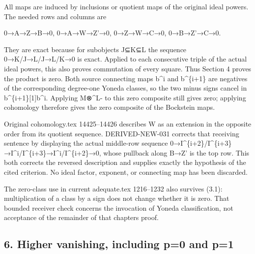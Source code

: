 All maps are induced by inclusions or quotient maps of the original ideal powers. The needed rows and columns are

0\allowbreak{}→A\allowbreak{}→Z\allowbreak{}→B\allowbreak{}→0,\allowbreak{} 0\allowbreak{}→A\allowbreak{}→W\allowbreak{}→Z'\allowbreak{}→0,\allowbreak{} 0\allowbreak{}→Z\allowbreak{}→W\allowbreak{}→C\allowbreak{}→0,\allowbreak{} 0\allowbreak{}→B\allowbreak{}→Z'\allowbreak{}→C\allowbreak{}→0.

They are exact because for subobjects J⊆K⊆L the sequence 0\allowbreak{}→K/\allowbreak{}J\allowbreak{}→L/\allowbreak{}J\allowbreak{}→L/\allowbreak{}K\allowbreak{}→0 is exact. Applied to each consecutive triple of the actual ideal powers,\allowbreak{} this also proves commutation of every square. Thus Section 4 proves the product is zero. Both source connecting maps b\^{}i and b\textasciicircum{}\{i\allowbreak{}+1\} are negatives of the corresponding degree-one Yoneda classes,\allowbreak{} so the two minus signs cancel in b\textasciicircum{}\{i\allowbreak{}+1\}[1]\allowbreak{}b\textasciicircum{}i. Applying M⊗\^{}L- to this zero composite still gives zero; applying cohomology therefore gives the zero composite of the Bockstein maps.

Original cohomology.tex 14425–\allowbreak{}14426 describes W as an extension in the opposite order from its quotient sequence. DERIVED-NEW-031 corrects that receiving sentence by displaying the actual middle-row sequence 0\allowbreak{}→I\textasciicircum{}\{i\allowbreak{}+2\}/\allowbreak{}I\textasciicircum{}\{i\allowbreak{}+3\}\allowbreak{}→I\textasciicircum{}i/\allowbreak{}I\textasciicircum{}\{i\allowbreak{}+3\}\allowbreak{}→I\textasciicircum{}i/\allowbreak{}I\textasciicircum{}\{i\allowbreak{}+2\}\allowbreak{}→0,\allowbreak{} whose pullback along B\allowbreak{}→Z' is the top row. This both corrects the reversed description and supplies exactly the hypothesis of the cited criterion. No ideal factor,\allowbreak{} exponent,\allowbreak{} or connecting map has been discarded.

The zero-class use in current adequate.tex 1216–\allowbreak{}1232 also survives (3.1)\allowbreak{}:\allowbreak{} multiplication of a class by a sign does not change whether it is zero. That bounded receiver check concerns the invocation of Yoneda classification,\allowbreak{} not acceptance of the remainder of that chapter\textquotesingle s proof.

\subsection{\texorpdfstring{6. Higher vanishing,\allowbreak{} including p\allowbreak{}=0 and p\allowbreak{}=1}{6. Higher  including  and }}\label{proofs-8774-9196-higher-vanishing-including-p0-and-p1}

